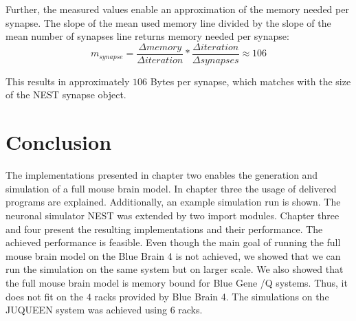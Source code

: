 Further, the measured values enable an approximation of the memory needed per synapse.
The slope of the mean used memory line divided by the slope of the mean number of synapses line returns
memory needed per synapse:
\begin{equation}
	m_{synapse} = \frac{\Delta memory}{\Delta iteration} * \frac{\Delta iteration}{\Delta synapses} \approx 106
\end{equation}

This results in approximately $106$ Bytes per synapse, which matches with the size of the NEST synapse object.









\section{Conclusion}
The implementations presented in chapter two enables the generation and simulation of a full mouse brain model.
In chapter three the usage of delivered programs are explained. Additionally, an example simulation run is shown.
The neuronal simulator NEST was extended by two import modules.
Chapter three and four present the resulting implementations and their performance.
The achieved performance is feasible.
Even though the main goal of running the full mouse brain model on the Blue Brain 4 is not achieved,
we showed that we can run the simulation on the same system but on larger scale.
We also showed  that the full mouse brain model is memory bound for Blue Gene /Q systems.
Thus, it does not fit on the $4$ racks provided by Blue Brain 4. 
The simulations on the JUQUEEN system was achieved using $6$ racks.

